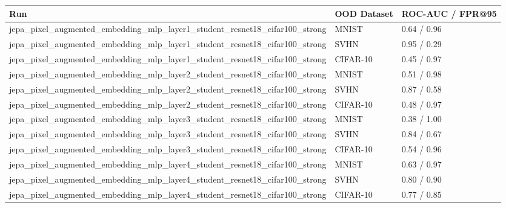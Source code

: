 \begin{tabular}{lll}
\toprule
Run & OOD Dataset & ROC-AUC / FPR@95 \\
\midrule
jepa\_pixel\_augmented\_embedding\_mlp\_layer1\_student\_resnet18\_cifar100\_strong & MNIST & 0.64 / 0.96 \\
jepa\_pixel\_augmented\_embedding\_mlp\_layer1\_student\_resnet18\_cifar100\_strong & SVHN & 0.95 / 0.29 \\
jepa\_pixel\_augmented\_embedding\_mlp\_layer1\_student\_resnet18\_cifar100\_strong & CIFAR-10 & 0.45 / 0.97 \\
jepa\_pixel\_augmented\_embedding\_mlp\_layer2\_student\_resnet18\_cifar100\_strong & MNIST & 0.51 / 0.98 \\
jepa\_pixel\_augmented\_embedding\_mlp\_layer2\_student\_resnet18\_cifar100\_strong & SVHN & 0.87 / 0.58 \\
jepa\_pixel\_augmented\_embedding\_mlp\_layer2\_student\_resnet18\_cifar100\_strong & CIFAR-10 & 0.48 / 0.97 \\
jepa\_pixel\_augmented\_embedding\_mlp\_layer3\_student\_resnet18\_cifar100\_strong & MNIST & 0.38 / 1.00 \\
jepa\_pixel\_augmented\_embedding\_mlp\_layer3\_student\_resnet18\_cifar100\_strong & SVHN & 0.84 / 0.67 \\
jepa\_pixel\_augmented\_embedding\_mlp\_layer3\_student\_resnet18\_cifar100\_strong & CIFAR-10 & 0.54 / 0.96 \\
jepa\_pixel\_augmented\_embedding\_mlp\_layer4\_student\_resnet18\_cifar100\_strong & MNIST & 0.63 / 0.97 \\
jepa\_pixel\_augmented\_embedding\_mlp\_layer4\_student\_resnet18\_cifar100\_strong & SVHN & 0.80 / 0.90 \\
jepa\_pixel\_augmented\_embedding\_mlp\_layer4\_student\_resnet18\_cifar100\_strong & CIFAR-10 & 0.77 / 0.85 \\
\bottomrule
\end{tabular}
